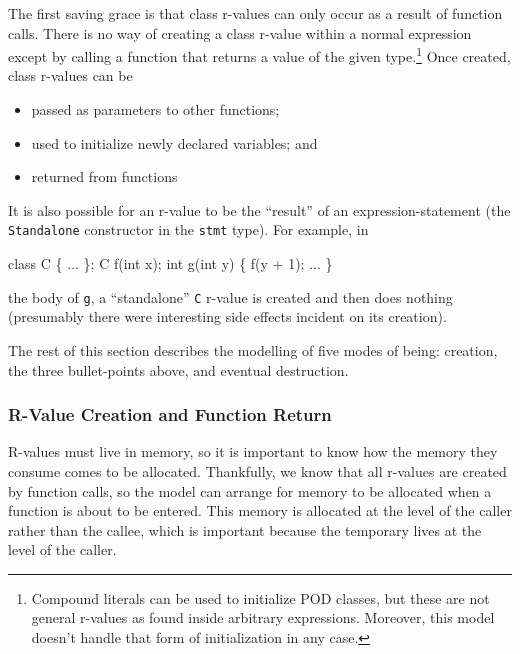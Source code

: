 \documentclass[11pt]{article}
\begin{document}
The first saving grace is that class r-values can only occur as a
result of function calls.  There is no way of creating a class r-value
within a normal expression except by calling a function that returns a
value of the given type.\footnote{Compound literals can be used to
  initialize POD classes, but these are not general r-values as found
  inside arbitrary expressions.  Moreover, this model doesn't handle
  that form of initialization in any case.}  Once created, class
r-values can be
\begin{itemize}
\item passed as parameters to other functions;
\item used to initialize newly declared variables; and
\item returned from functions
\end{itemize}
It is also possible for an r-value to be the ``result'' of an
expression-statement (the \texttt{Standalone} constructor in the
\texttt{stmt} type).  For example, in
\begin{stdrule}
   class C \{ ... \};
   C f(int x);
   int g(int y) \{ f(y + 1); ... \}
\end{stdrule}
the body of \texttt{g}, a ``standalone'' \texttt{C} r-value is created
and then does nothing (presumably there were interesting side effects
incident on its creation).

The rest of this section describes the modelling of five modes of being:
creation, the three bullet-points above, and eventual destruction.

\subsubsection{R-Value Creation and Function Return}
\label{sec:r-value-creation}

R-values must live in memory, so it is important to know how the
memory they consume comes to be allocated.  Thankfully, we know that
all r-values are created by function calls, so the model can arrange
for memory to be allocated when a function is about to be entered.
This memory is allocated at the level of the caller rather than the
callee, which is important because the temporary lives at the level of
the caller.
\end{document}
